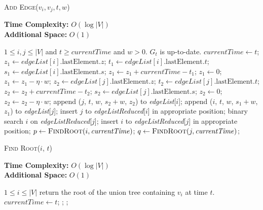 \documentclass[12pt,abstract=true]{scrartcl}
\numberwithin{equation}{section}
\theoremstyle{definition}   \newtheorem{definition}{Definition}[section]
\theoremstyle{plain}        \newtheorem{theorem}{Theorem}[section]
\theoremstyle{plain}        \newtheorem{observation}{Observation}[section]
\theoremstyle{plain}        \newtheorem{fact}{Fact}[section]
\theoremstyle{plain}        \newtheorem{claim}{Claim}[section]
\theoremstyle{plain}        \newtheorem{lemma}[theorem]{Lemma}
\theoremstyle{plain}        \newtheorem{corollary}[theorem]{Corollary}
\theoremstyle{remark}       \newtheorem{example}{Example}[section]
\theoremstyle{remark}       \newtheorem{remark}{Remark}[section]
\begin{document}
\begin{algorithm}[htbp]
\caption{\textsc{Add Edge}($v_i,v_j,t,w$)}
\label{alg-add}
\textbf{Time Complexity:} $O(\log |V|)$\\
\textbf{Additional Space:} $O(1)$
\begin{algorithmic}[1]
\Require $1\leq i,j\leq |V|$ and $t\geq \mathit{currentTime}$ and $w>0$.
\Ensure $G_t$ is up-to-date.
\State $\mathit{currentTime}\gets t$;
\State $z_1\gets\mathit{edgeList}[i].\mathrm{lastElement}.z$;
\State $t_1\gets\mathit{edgeList}[i].\mathrm{lastElement}.t$;
\State $s_1\gets\mathit{edgeList}[i].\mathrm{lastElement}.s$;
\State $z_1\gets z_1+\mathit{currentTime}-t_1$;
 \State $z_1\gets 0$;\EndIf
\State $z_1\gets z_1-\eta\cdot w$;
\State $z_2\gets\mathit{edgeList}[j].\mathrm{lastElement}.z$;
\State $t_2\gets\mathit{edgeList}[j].\mathrm{lastElement}.t$;
\State $z_2\gets z_2+\mathit{currentTime}-t_2$;
\State $s_2\gets\mathit{edgeList}[j].\mathrm{lastElement}.s$;
 \State $z_2\gets 0$;\EndIf
\State $z_2\gets z_2-\eta\cdot w$;
\State append ($j$, $t$, $w$, $s_2+w$, $z_2$) to \textit{edgeList}[$i$];
\State append ($i$, $t$, $w$, $s_1+w$, $z_1$) to \textit{edgeList}[$j$];
\State insert $j$ to \textit{edgeListReduced}[$i$] in appropriate position;
\State binary search $i$ on \textit{edgeListReduced}[$j$];
\State insert $i$ to \textit{edgeListReduced}[$j$] in appropriate position;
\EndIf
\State $p\gets \Call{FindRoot}{i,\mathit{currentTime}}$;
\State $q\gets \Call{FindRoot}{j,\mathit{currentTime}}$;
\State {}
\EndIf
\end{algorithmic}
\end{algorithm}

\begin{algorithm}[htbp]
\caption{\textsc{Find Root}($i$, $t$)}\label{alg-find}
\textbf{Time Complexity:} $O(\log |V|)$\\
\textbf{Additional Space:} $O(1)$
\begin{algorithmic}[1]
\Require $1\leq i\leq |V|$
\Ensure return the root of the union tree containing $v_i$ at time $t$.
\State $\mathit{currentTime}\gets t$;
	\State {};
\Else
	\State {};
\EndIf
\end{algorithmic}
\end{algorithm}
\end{document}
